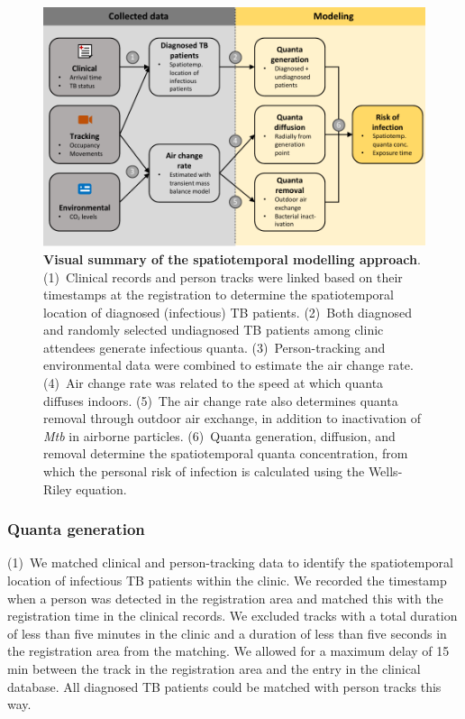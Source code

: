 \documentclass[fleqn,11pt]{wlscirep}
\begin{document}
\begin{figure}[!htpb]
    \centering
    \includegraphics{doc/model-flow-chart.pdf}
    \caption{\textbf{Visual summary of the spatiotemporal modelling approach}. (1)~Clinical records and person tracks were linked based on their timestamps at the registration to determine the spatiotemporal location of diagnosed (infectious) TB patients. (2)~Both diagnosed and randomly selected undiagnosed TB patients among clinic attendees generate infectious quanta. (3)~Person-tracking and environmental data were combined to estimate the air change rate. (4)~Air change rate was related to the speed at which quanta diffuses indoors. (5)~The air change rate also determines quanta removal through outdoor air exchange, in addition to inactivation of \emph{Mtb} in airborne particles. (6)~Quanta generation, diffusion, and removal determine the spatiotemporal quanta concentration, from which the personal risk of infection is calculated using the Wells-Riley equation.}
    \label{fig:modeling-flow}
\end{figure}

\subsubsection*{Quanta generation}

(1)~We matched clinical and person-tracking data to identify the spatiotemporal location of infectious TB patients within the clinic. We recorded the timestamp when a person was detected in the registration area and matched this with the registration time in the clinical records. We excluded tracks with a total duration of less than five minutes in the clinic and a duration of less than five seconds in the registration area from the matching. We allowed for a maximum delay of 15\,min between the track in the registration area and the entry in the clinical database. All diagnosed TB patients could be matched with person tracks this way. 
\end{document}
